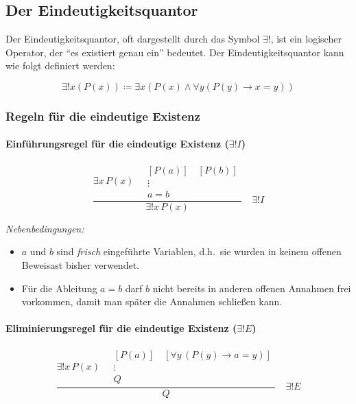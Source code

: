 \documentclass[main.tex]{subfiles}
\begin{document}
\subsection{Der Eindeutigkeitsquantor}


Der Eindeutigkeitsquantor, oft dargestellt durch das Symbol \(\exists!\), ist ein logischer Operator, der  "`es existiert genau ein"' bedeutet. Der Eindeutigkeitsquantor kann wie folgt definiert werden:
\begin{definition}[\(\exists !\)]
\label{ExonlyonexLpPLpxRpRpLrExxLpPLpxRpAndFayLpPLpyRpToxEqualsyRpRp}
\[
\exists! x(P(x)) \coloneqq \exists x(P(x) \land \forall y(P(y) \rightarrow x = y))
\]
\end{definition}

\subsubsection{Regeln für die eindeutige Existenz}

\paragraph{Einführungsregel für die eindeutige Existenz ($\exists! I$)}
\label{rule:UEI}

\[
\frac{
  \exists x\,P(x)
  \quad
  \begin{array}{c}
    [P(a)]\quad [P(b)] \\
    \vdots \\
    a = b 
  \end{array}
}{\exists! x\,P(x)}
\quad \exists! I
\]

\emph{Nebenbedingungen:}
\begin{itemize}
    \item \(a\) und \(b\) sind \emph{frisch} eingeführte Variablen, d.h.\ sie wurden in keinem offenen Beweisast bisher verwendet.
    \item Für die Ableitung \(a = b\) darf \(b\) nicht bereits in anderen offenen Annahmen frei vorkommen, damit man später die Annahmen schließen kann.
\end{itemize}

\paragraph{Eliminierungsregel  für die eindeutige Existenz  ($\exists! E$)}
\label{rule:UEE}


\[
\frac{
  \exists! x\,P(x)
  \quad
  \begin{array}{c}
    [P(a)]\quad [\forall y\,(P(y)\rightarrow a=y)]\\
    \vdots \\
    Q
  \end{array}
}{
  Q
}
\quad \exists! E
\]
\end{document}
